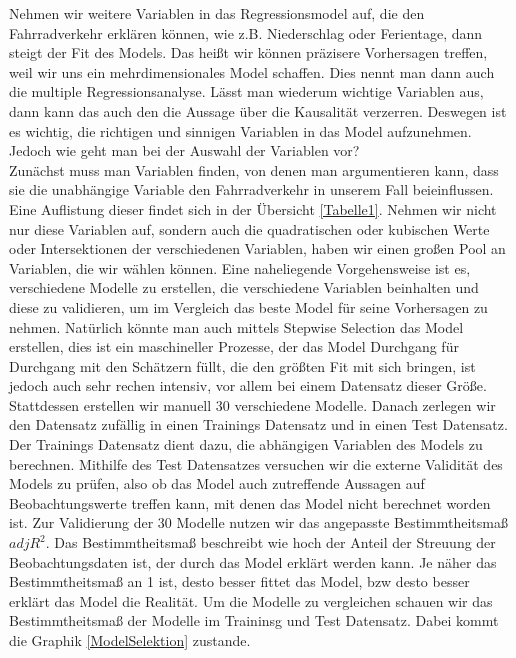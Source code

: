 \documentclass[a4paper,12pt]{thesis}
\begin{document}
Nehmen wir weitere Variablen in das Regressionsmodel auf, die den Fahrradverkehr erklären können, wie z.B. Niederschlag oder Ferientage, dann steigt der Fit des Models. Das heißt wir können präzisere Vorhersagen treffen, weil wir uns ein mehrdimensionales Model schaffen. Dies nennt man dann auch die multiple Regressionsanalyse. Lässt man wiederum wichtige Variablen aus, dann kann das auch den die Aussage über die Kausalität verzerren. Deswegen ist es wichtig, die richtigen und sinnigen Variablen in das Model aufzunehmen. Jedoch wie geht man bei der Auswahl der Variablen vor?\\
Zunächst muss man Variablen finden, von denen man argumentieren kann, dass sie die unabhängige Variable den Fahrradverkehr in unserem Fall beieinflussen. Eine Auflistung dieser findet sich in der Übersicht \ref{Tabelle1}. Nehmen wir nicht nur diese Variablen auf, sondern auch die quadratischen oder kubischen Werte oder Intersektionen der verschiedenen Variablen, haben wir einen großen Pool an Variablen, die wir wählen können. Eine naheliegende Vorgehensweise ist es, verschiedene Modelle zu erstellen, die verschiedene Variablen beinhalten und diese zu validieren, um im Vergleich das beste Model für seine Vorhersagen zu nehmen. Natürlich könnte man auch mittels Stepwise Selection das Model erstellen, dies ist ein maschineller Prozesse, der das Model Durchgang für Durchgang mit den Schätzern füllt, die den größten Fit mit sich bringen, ist jedoch auch sehr rechen intensiv, vor allem bei einem Datensatz dieser Größe.\\

Stattdessen erstellen wir manuell 30 verschiedene Modelle. Danach zerlegen wir den Datensatz zufällig in einen Trainings Datensatz und in einen Test Datensatz. Der Trainings Datensatz dient dazu, die abhängigen Variablen des Models zu berechnen. Mithilfe des Test Datensatzes versuchen wir die externe Validität des Models zu prüfen, also ob das Model auch zutreffende Aussagen auf Beobachtungswerte treffen kann, mit denen das Model nicht berechnet worden ist. Zur Validierung der 30 Modelle nutzen wir das angepasste Bestimmtheitsmaß $adj R^2$. Das Bestimmtheitsmaß beschreibt wie hoch der Anteil der Streuung der Beobachtungsdaten ist, der durch das Model erklärt werden kann. Je näher das Bestimmtheitsmaß an 1 ist, desto besser fittet das Model, bzw desto besser erklärt das Model die Realität. Um die Modelle zu vergleichen schauen wir das Bestimmtheitsmaß der Modelle im Traininsg und Test Datensatz. Dabei kommt die Graphik \ref{ModelSelektion} zustande.
\end{document}
